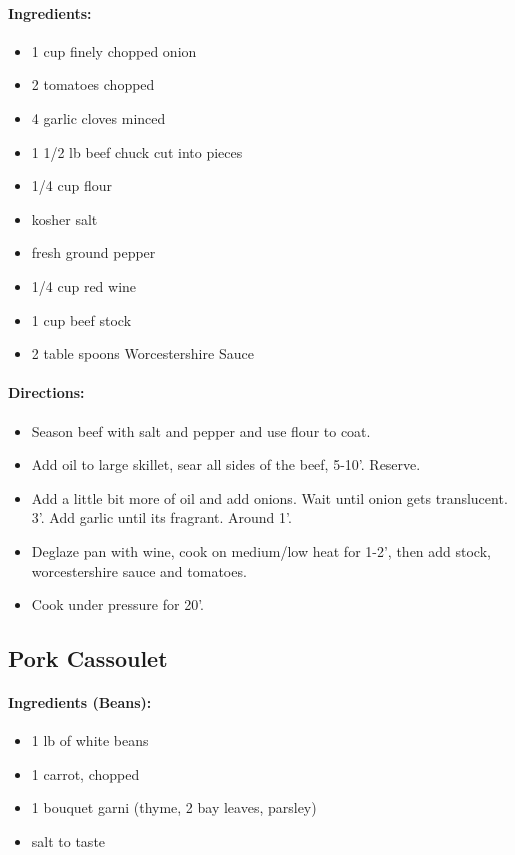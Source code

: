 \documentclass{article}
\begin{document}
\paragraph{Ingredients:}
\begin{itemize}
  \item 1 cup finely chopped onion
  \item 2 tomatoes chopped
  \item 4 garlic cloves minced
  \item 1 1/2 lb beef chuck cut into pieces
  \item 1/4 cup flour
  \item kosher salt
  \item fresh ground pepper
  \item 1/4 cup red wine
  \item 1 cup beef stock
  \item 2 table spoons Worcestershire Sauce	
\end{itemize}

\paragraph{Directions:}
\begin{itemize}
  \item Season beef with salt and pepper and use flour to coat.
  \item Add oil to large skillet, sear all sides of the beef, 5-10’. Reserve.
  \item Add a little bit more of oil and add onions. Wait until onion gets translucent. 3’. Add garlic until its
fragrant. Around 1’.
  \item Deglaze pan with wine, cook on medium/low heat for 1-2’, then add stock, worcestershire sauce and
tomatoes.
  \item Cook under pressure for 20’.
\end{itemize}

\subsection{Pork Cassoulet}

\paragraph{Ingredients (Beans):}
\begin{itemize}
	\item 1 lb of white beans
	\item 1 carrot, chopped
	\item 1 bouquet garni (thyme, 2 bay leaves, parsley)
	\item salt to taste
\end{itemize}
\end{document}
